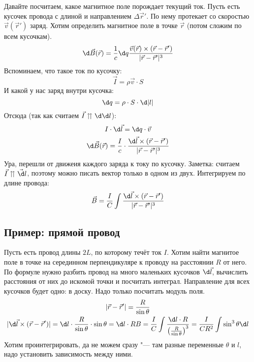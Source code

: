   Давайте посчитаем, какое магнитное поле порождает текущий ток.
  Пусть есть кусочек провода с длиной и направлением $\Delta \vec r'$.
  По нему протекает со скоростью $\vec v(\vec r')$ заряд.
  Хотим определить магнитное поле в точке $\vec r$ (потом сложим по всем кусочкам).
  \[ \d \vec B(\vec r) = \frac 1 c \d q \frac{\vec v(\vec r) \times (\vec r - \vec r')}{|\vec r - \vec r'|^3}\]
  Вспоминаем, что такое ток по кусочку:
  \[ \vec I = \rho \vec v \cdot S \]
  И какой у нас заряд внутри кусочка:
  \[ \d q = \rho \cdot S \cdot \d |l|\]
  Отсюда (так как считаем $\vec I \upuparrows \d \d l$):
  \begin{gather*}
    I \cdot \d \vec l = \d q \cdot \vec v \\
    \d \vec B(\vec r) = \frac I c \cdot \frac{\d \vec l \times (\vec r - \vec r')}{|\vec r - \vec r'|^3}
  \end{gather*}
  Ура, перешли от движеия каждого заряда к току по кусочку.
  Заметка: считаем $\vec I \upuparrows \vec \d l$, поэтому можно писать вектор только в одном из двух.
  Интегрируем по длине провода:
  \[
    \vec B = \frac I C \int \frac{\d \vec l \times (\vec r - \vec r')}{|\vec r - \vec r'|^3}
  \]

  \subsection{Пример: прямой провод}
  Пусть есть провод длины $2L$, по которому течёт ток $I$.
  Хотим найти магнитое поле в точке на серединном перпендикуляре к проводу на расстоянии $R$ от него.
  По формуле нужно разбить провод на много маленьких кусочков $\d \vec l$,
  вычислить расстояния от них до искомой точки и посчитать интеграл.
  Направление для всех кусочков будет одно: в доску.
  Надо только посчитать модуль поля.
  \begin{gather*}
  | \vec r - \vec r' | = \frac R{\sin \theta} \\
  | \d \vec l \times (\vec r - \vec r') | = \d l \cdot \frac{R}{\sin \theta} \cdot \sin \theta = \d l \cdot R
  B = \frac I C \int \frac{\d l \cdot R}{\left(\frac R{\sin \theta}\right)^3}
    = \frac I {CR^2} \int \sin^3 \theta \d l
  \end{gather*}
  Хотим проинтегрировать, да не можем сразу "--- там разные переменные $\theta$ и $l$, надо установить зависимость между ними.
  
